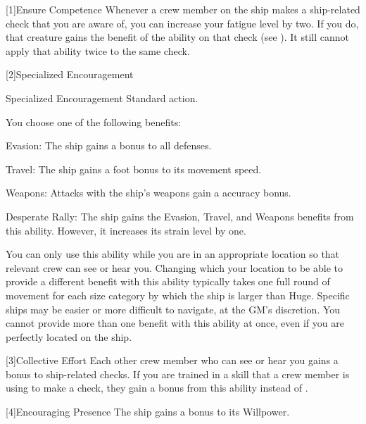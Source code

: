     [1]{Ensure Competence} Whenever a crew member on the ship makes a ship-related check that you are aware of, you can increase your fatigue level by two.
      If you do, that creature gains the benefit of the  ability on that check (see ).
      It still cannot apply that ability twice to the same check.

    [2]{Specialized Encouragement}
      \begin{activeability}{Specialized Encouragement}
        \abilityusagetime Standard action.
        \rankline

        You choose one of the following benefits:
        \begin{raggeditemize}
          \item Evasion: The ship  gains a  bonus to all defenses.
          \item Travel: The ship  gains a  foot bonus to its movement speed.
          \item Weapons: Attacks with the ship's weapons  gain a  accuracy bonus.
          \item Desperate Rally: The ship  gains the Evasion, Travel, and Weapons benefits from this ability.
            However, it increases its strain level by one.
        \end{raggeditemize}

        You can only use this ability while you are in an appropriate location so that relevant crew can see or hear you.
        Changing which your location to be able to provide a different benefit with this ability typically takes one full round of movement for each size category by which the ship is larger than Huge.
        Specific ships may be easier or more difficult to navigate, at the GM's discretion.
        You cannot provide more than one benefit with this ability at once, even if you are perfectly located on the ship.
      \end{activeability}

    [3]{Collective Effort} Each other crew member who can see or hear you gains a  bonus to ship-related checks.
      If you are trained in a skill that a crew member is using to make a check, they gain a  bonus from this ability instead of .

    [4]{Encouraging Presence} The ship gains a  bonus to its Willpower.

